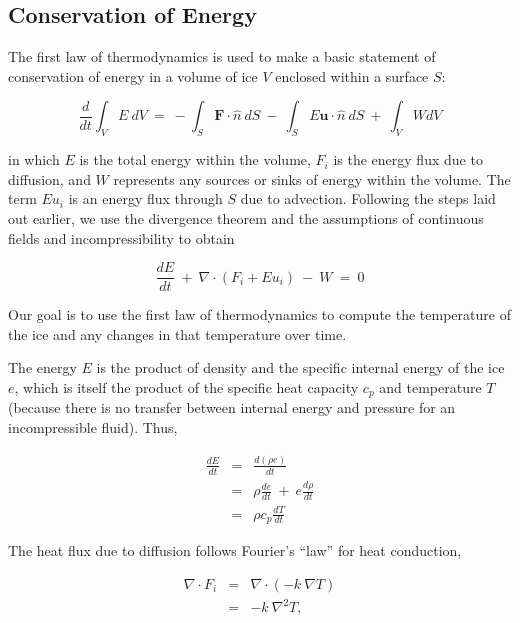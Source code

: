 \subsection{Conservation of Energy}

The first law of thermodynamics is used to make a basic statement of conservation of energy in a volume of ice $V$ enclosed within a surface $S$:

\begin{equation}
\frac{d}{d t} \int_{V}E ~dV~=~- \int_{S}\mathbf{F}\cdot \hat{n}~dS~-~\int_{S}E \mathbf{u}\cdot \hat{n}~dS~+~\int_{V}W dV
\label{eq:enbal1}
\end{equation}

\noindent
in which $E$ is the total energy within the volume, $F_{i}$ is the energy flux due
to diffusion, and $W$ represents any sources or sinks of energy within
the volume. The term $Eu_{i}$ is an energy flux through $S$ due to advection.
Following the steps laid out earlier, we use the divergence theorem and
the assumptions of continuous fields and incompressibility to obtain

\begin{equation}
\frac{dE}{dt}~+~\nabla \cdot \left(F_{i} +E u_{i}  \right)~-~W~=~0
\label{eq:enbal2}
\end{equation}

\noindent
Our goal is to use the first law of thermodynamics to compute the temperature of the ice and any changes in that temperature over time.

The energy $E$ is the product of density and the specific internal
energy of the ice $e$, which is itself the product of the specific heat
capacity $c_{p}$ and temperature $T$ (because there is no transfer
between internal energy and pressure for an incompressible fluid). Thus,

\begin{equation}
\begin{matrix}
\frac{dE}{dt}&=&\frac{d\left(\rho e \right)}{dt} \\
&=&\rho\frac{de}{dt}~+~e \frac{d\rho}{dt}\\
&=&\rho c_{p} \frac{dT}{dt}
\end{matrix}
\label{eq:enbal3}
\end{equation}

\noindent
The heat flux due to diffusion follows Fourier's ``law'' for heat conduction,

\begin{equation}
\begin{matrix}
\nabla \cdot F_{i}&=&\nabla \cdot \left( -k ~\nabla T  \right) \\
&=&-k~\nabla^{2}T,
\end{matrix}
\label{eq:enbal4}
\end{equation}


